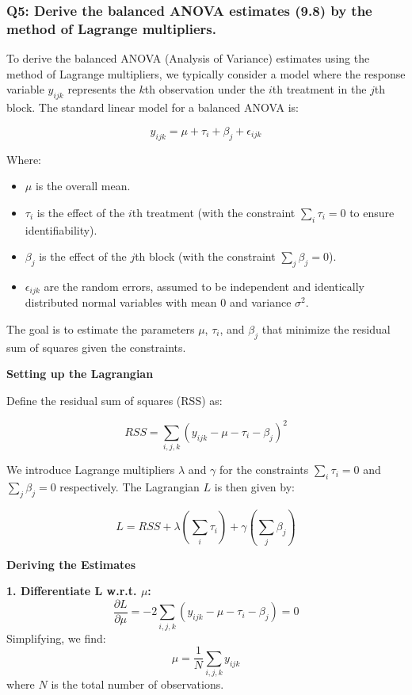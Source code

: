 \documentclass[8pt]{article}
\begin{document}
\subsubsection*{Q5: Derive the balanced ANOVA estimates (9.8) by the method of Lagrange multipliers.}

To derive the balanced ANOVA (Analysis of Variance) estimates using the method of Lagrange multipliers, we typically consider a model where the response variable \(y_{ijk}\) represents the \(k\)th observation under the \(i\)th treatment in the \(j\)th block. The standard linear model for a balanced ANOVA is:

\[
y_{ijk} = \mu + \tau_i + \beta_j + \epsilon_{ijk}
\]

Where:
\begin{itemize}
    \item \(\mu\) is the overall mean.
    \item \(\tau_i\) is the effect of the \(i\)th treatment (with the constraint \(\sum_i \tau_i = 0\) to ensure identifiability).
    \item \(\beta_j\) is the effect of the \(j\)th block (with the constraint \(\sum_j \beta_j = 0\)).
    \item \(\epsilon_{ijk}\) are the random errors, assumed to be independent and identically distributed normal variables with mean 0 and variance \(\sigma^2\).
\end{itemize}

The goal is to estimate the parameters \(\mu\), \(\tau_i\), and \(\beta_j\) that minimize the residual sum of squares given the constraints.

\textbf{Setting up the Lagrangian}

Define the residual sum of squares (RSS) as:

\[
RSS = \sum_{i,j,k} (y_{ijk} - \mu - \tau_i - \beta_j)^2
\]

We introduce Lagrange multipliers \(\lambda\) and \(\gamma\) for the constraints \(\sum_i \tau_i = 0\) and \(\sum_j \beta_j = 0\) respectively. The Lagrangian \(L\) is then given by:

\[
L = RSS + \lambda \left(\sum_i \tau_i\right) + \gamma \left(\sum_j \beta_j\right)
\]

\textbf{Deriving the Estimates}

\textbf{1. Differentiate L w.r.t. \(\mu\):}
   \[
   \frac{\partial L}{\partial \mu} = -2 \sum_{i,j,k} (y_{ijk} - \mu - \tau_i - \beta_j) = 0
   \]
   Simplifying, we find:
   \[
   \mu = \frac{1}{N} \sum_{i,j,k} y_{ijk}
   \]
   where \(N\) is the total number of observations.
\end{document}
